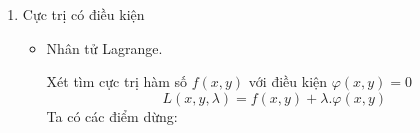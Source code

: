 \documentclass[12pt,a4paper]{report}
\begin{document}
{\begin{center}
\begin{enumerate}
\begin{itemize}
                    Nếu $A < 0$ hoặc $C < 0$ $\Rightarrow$ cực đại địa phương.
                    
                    Nếu $AC - B^{2} < 0$ $\Rightarrow$ không phải cực trị.

                    Nếu $AC - B^{2} = 0$ $\Rightarrow$ cũng có thể là có, cũng có thể là không.
            
            \end{itemize}
                
        \item Cực trị có điều kiện
            \begin{itemize}
                \item Nhân tử  Lagrange.
                    
                Xét tìm cực trị hàm số $f(x, y)$ với điều kiện $\varphi(x, y) = 0$
                \[L(x, y, \lambda) = f(x, y) + \lambda . \varphi(x, y)\]
                Ta có các điểm dừng:
                
            \end{itemize}
   		
            
    \end{enumerate}
    
\end{center}




}
\end{document}
